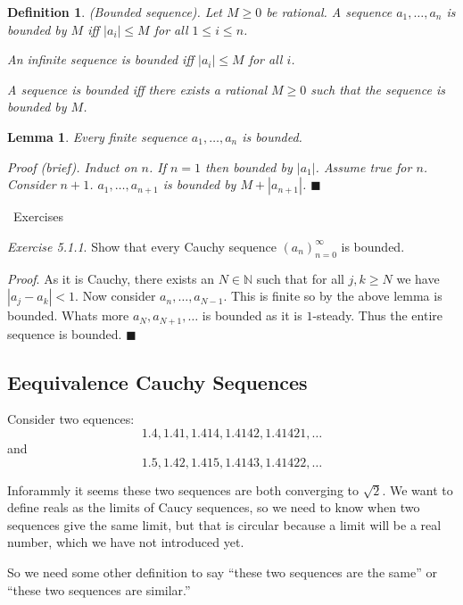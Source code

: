 \documentclass{article}
\newtheorem{definition}{Definition}[subsection]
\newtheorem{lemma}{Lemma}[subsection]
\newcommand{\N}{\mathbb{N}}
\newcommand{\exercisesline}{	%
    \begin{center}
    \textemdash\ Exercises\ \textemdash
    \end{center}
}
\let\it\textit
\begin{document}
\begin{definition}
	(Bounded sequence). Let $M \geq 0$ be rational. A sequence 
	$a_1, \dots, a_n$
	is bounded by $M$ iff $|a_i| \leq M$ for all $1 \leq i \leq n$.

	An infinite sequence is bounded iff $|a_i| \leq M$ for all $i$.

	A sequence is bounded iff there exists a rational $M \geq 0$ such that
	the sequence is bounded by $M$.
\end{definition}

\begin{lemma}
	Every finite sequence $a_1, \dots, a_n$ is bounded.	

	\it{Proof} (brief). Induct on $n$. If $n=1$ then 
	bounded by $|a_1|$. Assume true for $n$. Consider $n+1$.
	$a_1, \dots, a_{n+1}$ is bounded by $M + |a_{n+1}|$.
	\hfill $\blacksquare$
\end{lemma}

\exercisesline

\it{Exercise 5.1.1}. Show that every Cauchy sequence 
$(a_n)_{n=0}^\infty$ is bounded. 

\it{Proof}. As it is Cauchy, there exists an $N \in \N$ such that 
for all $j,k  \geq N$ we have $|a_j - a_k| < 1$. Now 
consider $a_n, \dots, a_{N-1}$. This is finite so by the above 
lemma is bounded. Whats more $a_{N}, a_{N+1}, \dots$ is 
bounded as it is $1$-steady. Thus the entire sequence is
bounded. \hfill $\blacksquare$


\subsection{Eequivalence Cauchy Sequences}

Consider two equences:
$$
1.4, 1.41, 1.414, 1.4142, 1.41421, \ldots
$$
and 
$$
1.5, 1.42, 1.415, 1.4143, 1.41422, \ldots
$$

Inforammly it seems these two sequences are both converging 
to $\sqrt{2}$.  We want to define reals as the limits 
of Caucy sequences, so we need to know when two sequences 
give the same limit, but that is circular because a limit 
will be a real number, which we have not introduced yet.

So we need some other definition to say ``these two sequences 
are the same'' or ``these two sequences are similar.''
\end{document}
